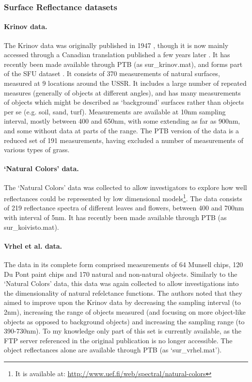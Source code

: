 
\subsubsection{Surface Reflectance datasets}

\paragraph{Krinov data.}
The Krinov data was originally published in 1947 \citep{krinov_spektralnaya_1947}, though it is now mainly accessed through a Canadian translation published a few years later \cite{krinov_spectral_1953}. It has recently been made available through \gls{PTB} \cite{brainard_psychophysics_1997} (as sur\_krinov.mat), and forms part of the SFU dataset \cite{barnard_data_2002}. It consists of 370 measurements of natural surfaces, measured at 9 locations around the USSR. It includes a large number of repeated measures (generally of objects at different angles), and has many measurements of objects which might be described as `background' surfaces rather than objects per se (e.g. soil, sand, turf). Measurements are available at 10nm sampling interval, mostly between 400 and 650nm, with some extending as far as 900nm, and some without data at parts of the range. The \gls{PTB} version of the data is a reduced set of 191 measurements, having excluded a number of measurements of various types of grass. 

\paragraph{`Natural Colors' data.}
The `Natural Colors' data \citep{parkkinen_spectral_1988} was collected to allow investigators to explore how well reflectances could be represented by low dimensional models\footnote{It is available at: \url{http://www.uef.fi/web/spectral/natural-colors}}. The data consists of 219 reflectance spectra of different leaves and flowers, between 400 and 700nm with interval of 5nm. It has recently been made available through \gls{PTB} (as sur\_koivisto.mat).

\paragraph{Vrhel et al. data.}
The \citet{vrhel_measurement_1994} data in its complete form comprised measurements of 64 Munsell chips, 120 Du Pont paint chips and 170 natural and non-natural objects. Similarly to the `Natural Colors' data, this data was again collected to allow investigations into the dimensionality of natural refelctance functions. The authors noted that they aimed to improve upon the Krinov data by decreasing the sampling interval (to 2nm), increasing the range of objects measured (and focusing on more object-like objects as opposed to background objects) and increasing the sampling range (to 390-730nm). To my knowledge only part of this set is currently available, as the FTP server referenced in the original publication is no longer accessible. The object reflectances alone are available through \gls{PTB} (as `sur\_vrhel.mat').


